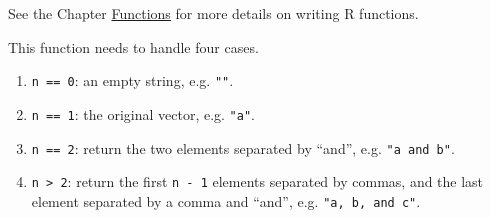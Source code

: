 \documentclass[]{book}
\providecommand{\tightlist}{%
  \setlength{\itemsep}{0pt}\setlength{\parskip}{0pt}}
\theoremstyle{plain}
\theoremstyle{remark}
\begin{document}
See the Chapter \protect\hyperlink{functions}{Functions} for more
details on writing R functions.

This function needs to handle four cases.

\begin{enumerate}
\def\labelenumi{\arabic{enumi}.}
\tightlist
\item
  \texttt{n\ ==\ 0}: an empty string, e.g. \texttt{""}.
\item
  \texttt{n\ ==\ 1}: the original vector, e.g. \texttt{"a"}.
\item
  \texttt{n\ ==\ 2}: return the two elements separated by ``and'', e.g.
  \texttt{"a\ and\ b"}.
\item
  \texttt{n\ \textgreater{}\ 2}: return the first \texttt{n\ -\ 1}
  elements separated by commas, and the last element separated by a
  comma and ``and'', e.g. \texttt{"a,\ b,\ and\ c"}.
\end{enumerate}
\end{document}
